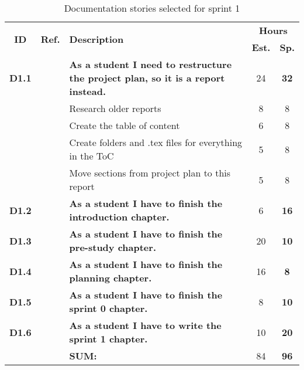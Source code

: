 \def\arraystretch{1.25}
\begin{longtable}{ccXcc}
\label{tab:sprint1Documentationstories}\\[-6mm]
\caption{Documentation stories selected for sprint 1}\\[-4mm]
\toprule[0.5mm]
\multirow{2}{*}{\textbf{ID}} &
\multirow{2}{*}{\textbf{Ref.}} & \multirow{2}{*}{\textbf{Description}} & \multicolumn{2}{c}{\textbf{Hours}} \\
 					& & & \textbf{Est.} & \textbf{Sp.} \\
\midrule
\textbf{D1.1} 	&& {\bf As a student I need to restructure the project plan, so it is a report instead.}	& 	 	24	& \textbf{32} \\
			&& Research older reports 										& 8	& 8\\
			&& Create the table of content 									& 6 & 8\\
			&& Create folders and .tex files for everything in the ToC 		& 5 & 8\\
			&& Move sections from project plan to this report 				& 5 & 8\\

\textbf{D1.2} 	&& {\bf As a student I have to finish the introduction chapter.} 							& 		6	& \textbf{16} \\

\textbf{D1.3} 	&& {\bf As a student I have to finish the pre-study chapter.} 								& 		20	& \textbf{10} \\

\textbf{D1.4} 	&& {\bf As a student I have to finish the planning chapter.} 								& 		16	& \textbf{8} \\

\textbf{D1.5} 	&& {\bf As a student I have to finish the sprint 0 chapter.} 								& 		8	& \textbf{10} \\

\textbf{D1.6} 	&& {\bf As a student I have to write the sprint 1 chapter.} 								& 		10	& \textbf{20} \\							
				
\hline
				&& \textbf{SUM:}		&		84	& \textbf{96}
 \\																			
\bottomrule[0.5mm]
\end{longtable}
